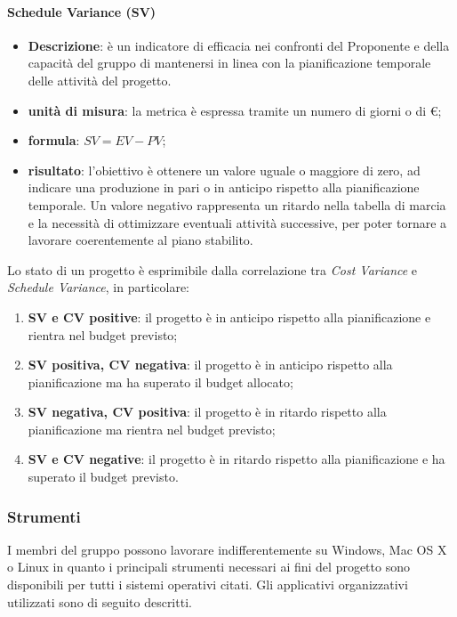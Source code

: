 				\paragraph{Schedule Variance (SV)}
					\begin{itemize}
						\item \textbf{Descrizione}: è un indicatore di efficacia nei confronti del Proponente e della capacità del gruppo di mantenersi in linea con la pianificazione temporale delle attività del progetto.
						\item \textbf{unità di misura}: la metrica è espressa tramite un numero di giorni o di \euro;
						\item \textbf{formula}: $SV = EV - PV$;
						\item \textbf{risultato}: l'obiettivo è ottenere un valore uguale o maggiore di zero, ad indicare una produzione in pari o in anticipo rispetto alla pianificazione temporale. Un valore negativo rappresenta un ritardo nella tabella di marcia e la necessità di ottimizzare eventuali attività successive, per poter tornare a lavorare coerentemente al piano stabilito.
					\end{itemize}
		        Lo stato di un progetto è esprimibile dalla correlazione tra \textit{Cost Variance} e \textit{Schedule Variance}, in particolare:
		        \begin{enumerate}
			          \item{\textbf{SV e CV positive}: il progetto è in anticipo rispetto alla pianificazione e rientra nel budget previsto;}
			          \item{\textbf{SV positiva, CV negativa}: il progetto è in anticipo rispetto alla pianificazione ma ha superato il budget allocato;}
			          \item{\textbf{SV negativa, CV positiva}: il progetto è in ritardo rispetto alla pianificazione ma rientra nel budget previsto;}
			          \item{\textbf{SV e CV negative}: il progetto è in ritardo rispetto alla pianificazione e ha superato il budget previsto.}
		        \end{enumerate}
			\subsubsection{Strumenti}
				I membri del gruppo \Gruppo{} possono lavorare indifferentemente su Windows, Mac OS X o Linux in quanto i principali strumenti necessari ai fini del progetto sono disponibili per tutti i sistemi operativi citati. Gli applicativi organizzativi utilizzati sono di seguito descritti.

